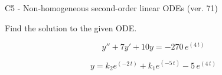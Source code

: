 \begin{exercise}
  \begin{exerciseTitle}C5 - Non-homogeneous second-order linear ODEs (ver. 71)\end{exerciseTitle}
  \begin{exerciseStatement}
    
Find the solution to the given ODE.

    
\[y''+7y'+10y = -270 \, e^{\left(4 \, t\right)}\]

  \end{exerciseStatement}
  \begin{exerciseAnswer}
    
\[y= k_{2} e^{\left(-2 \, t\right)} + k_{1} e^{\left(-5 \, t\right)} - 5 \, e^{\left(4 \, t\right)}\]

  \end{exerciseAnswer}
\end{exercise}